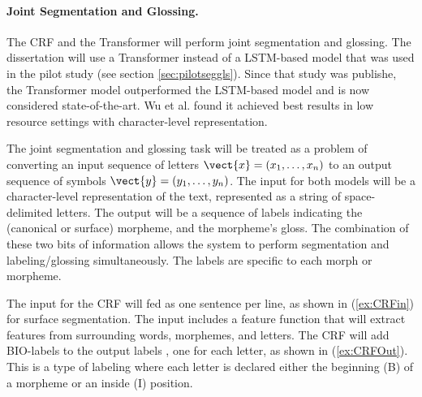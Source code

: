 \paragraph{Joint Segmentation and Glossing.}
The CRF and the Transformer will perform joint segmentation and glossing. The dissertation will use a Transformer instead of a LSTM-based model that was used in the pilot study (see section \ref{sec:pilotseggls}). Since that study was publishe, the Transformer model outperformed the LSTM-based model and is now considered state-of-the-art. Wu et al. \cite{wu2020applying} found it achieved best results in low resource settings with character-level representation. 


The joint segmentation and glossing task will be treated as a problem of converting an input sequence of letters $\vect{x} = (x_1, \ldots, x_n)$ to an output sequence of symbols $\vect{y} = (y_1, \ldots, y_n)$. The input for both models will be a character-level representation of the text, represented as a string of space-delimited letters. The output will be a sequence of labels indicating the (canonical or surface) morpheme, and the morpheme's gloss. The combination of these two bits of information allows the system to perform segmentation and labeling/glossing simultaneously. The labels are specific to each morph or morpheme. %

The input for the CRF will fed as one sentence per line, as shown in (\ref{ex:CRFin}) for surface segmentation. The input includes a feature function that will extract features from surrounding words, morphemes, and letters. The CRF will add BIO-labels to the output labels \cite{ramshaw1999}, one for each letter, as shown in (\ref{ex:CRFOut}). This is a type of labeling where each letter is declared either the beginning (B) of a morpheme or an inside (I) position. 

